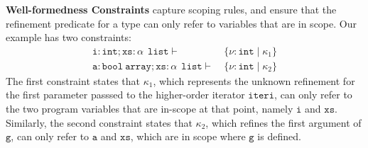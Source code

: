 \documentclass[nocopyrightspace]{sigplanconf}
\def\mypara#1{\smallskip\noindent\textbf{#1}}
\def\set#1{{\{ #1\}}}
\newcommand{\ttg}{\mathtt{g}}
\newcommand{\ttxs}{\mathtt{xs}}
\newcommand{\tta}{\mathtt{a}}
\newcommand{\tti}{\mathtt{i}}
\newcommand{\ttiteri}{\mathtt{iteri}}
\def\ttxs{\mathtt{xs}}
\def\valu{\nu}
\newcommand{\ftyp}[2]{{{#1}\!:\!{#2}}}
\newcommand{\ttarray}{\xspace \mathtt{array}}
\newcommand{\ttlist}{\ \mathtt{list}}
\newcommand{\kvar}{\kappa}
\def\ttint{\mathtt{int}}
\def\ttbool{\mathtt{bool}}
\newcommand{\reftyp}[3]{\set{\ftyp{{#1}}{{#2}} \mid {#3}}}
\newcommand{\deriv}{\vdash\ }
\begin{document}
\mypara{Well-formedness Constraints } 
capture scoping rules, and ensure that the
refinement predicate for a type can only refer to variables that are in scope.
Our example has two constraints:
\begin{align}
\ftyp{\tti}{\ttint}; \ftyp{\ttxs}{\alpha\ \ttlist} \deriv & \reftyp{\valu}{\ttint}{\kvar_1} \label{eq:w1} \tag{w1} \\
\ftyp{\tta}{\ttbool\ \ttarray}; \ftyp{\ttxs}{\alpha\ \ttlist} \deriv & \reftyp{\valu}{\ttint}{\kvar_2} \label{eq:w2} \tag{w2} 
\end{align}
The first constraint states that $\kvar_1$, which represents the unknown 
refinement for the first parameter passsed to the higher-order
iterator $\ttiteri$, can only refer to the two program variables that are in-scope at that
point, namely $\tti$ and $\ttxs$.
Similarly, the second constraint states that $\kvar_2$, which refines 
the first argument of $\ttg$, can only refer to $\tta$ and $\ttxs$, which
are in scope where $\ttg$ is defined.
\end{document}
